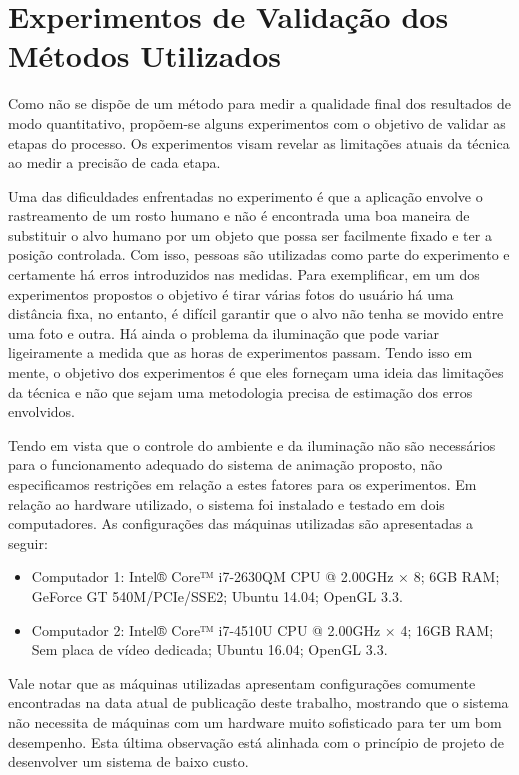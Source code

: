 

\section{Experimentos de Validação dos Métodos Utilizados}

Como não se dispõe de um método para medir a qualidade final dos resultados de
modo quantitativo, propõem-se alguns experimentos com o objetivo de validar as
etapas do processo. Os experimentos visam revelar as limitações atuais da
técnica ao medir a precisão de cada etapa.

Uma das dificuldades enfrentadas no experimento é que a aplicação envolve o
rastreamento de um rosto humano e não é encontrada uma boa maneira de substituir
o alvo humano por um objeto que possa ser facilmente fixado e ter a posição
controlada. Com isso, pessoas são utilizadas como parte do experimento e
certamente há erros introduzidos nas medidas. Para exemplificar, em um dos
experimentos propostos o objetivo é tirar várias fotos do usuário há uma
distância fixa, no entanto, é difícil garantir que o alvo não tenha se movido
entre uma foto e outra. Há ainda o problema da iluminação que pode variar
ligeiramente a medida que as horas de experimentos passam. Tendo isso em mente,
o objetivo dos experimentos é que eles forneçam uma ideia das limitações da
técnica e não que sejam uma metodologia precisa de estimação dos erros
envolvidos. 

Tendo em vista que o controle do ambiente e da iluminação não são necessários para o
funcionamento adequado do sistema de animação proposto, não especificamos 
restrições em relação a estes fatores para os experimentos. Em relação ao hardware 
utilizado, o sistema foi instalado e testado em dois computadores. As configurações das 
máquinas utilizadas são apresentadas a seguir: 

\begin{itemize}
\item Computador 1: Intel® Core™ i7-2630QM CPU @ 2.00GHz × 8; 6GB RAM; GeForce GT 540M/PCIe/SSE2;
Ubuntu 14.04; OpenGL 3.3.
\item Computador 2: Intel® Core™ i7-4510U CPU @ 2.00GHz × 4; 16GB RAM; Sem placa de vídeo
dedicada; Ubuntu 16.04; OpenGL 3.3.
\end{itemize}

Vale notar que as máquinas utilizadas apresentam configurações comumente encontradas na data 
atual de publicação deste trabalho, mostrando que o sistema não necessita de máquinas
com um hardware muito sofisticado para ter um bom desempenho. Esta última observação está 
alinhada com o princípio de projeto de desenvolver um sistema de baixo custo.

